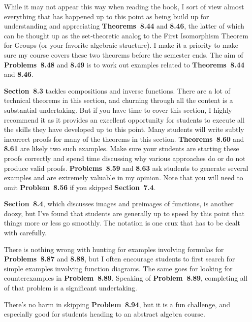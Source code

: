 \documentclass[11pt]{article}%
\newcommand{\blankline}{\pagebreak[2]\vspace{.5\baselineskip}}
\begin{document}
\blankline

While it may not appear this way when reading the book, I sort of view almost everything that has happened up to this point as being build up for understanding and appreciating \textbf{Theorems~8.44} and \textbf{8.46}, the latter of which can be thought up as the set-theoretic analog to the First Isomorphism Theorem for Groups (or your favorite algebraic structure). I make it a priority to make sure my course covers these two theorems before the semester ends.  The aim of \textbf{Problems~8.48} and \textbf{8.49} is to work out examples related to \textbf{Theorems~8.44} and \textbf{8.46}.

\blankline

\textbf{Section~8.3} tackles compositions and inverse functions. There are a lot of technical theorems in this section, and churning through all the content is a substantial undertaking.  But if you have time to cover this section, I highly recommend it as it provides an excellent opportunity for students to execute all the skills they have developed up to this point.  Many students will write subtly incorrect proofs for many of the theorems in this section. \textbf{Theorems~8.60} and \textbf{8.61} are likely two such examples. Make sure your students are starting these proofs correctly and spend time discussing why various approaches do or do not produce valid proofs. \textbf{Problems~8.59} and \textbf{8.63} ask students to generate several examples and are extremely valuable in my opinion. Note that you will need to omit \textbf{Problem~8.56} if you skipped \textbf{Section~7.4}.  

\blankline

\textbf{Section~8.4}, which discusses images and preimages of functions, is another doozy, but I've found that students are generally up to speed by this point that things more or less go smoothly.  The notation is one crux that has to be dealt with carefully.  

\blankline

There is nothing wrong with hunting for examples involving formulas for \textbf{Problems~8.87} and \textbf{8.88}, but I often encourage students to first search for simple examples involving function diagrams. The same goes for looking for counterexamples in \textbf{Problem~8.89}.  Speaking of \textbf{Problem~8.89}, completing all of that problem is a significant undertaking.

\blankline

There's no harm in skipping \textbf{Problem~8.94}, but it is a fun challenge, and especially good for students heading to an abstract algebra course.
\end{document}

